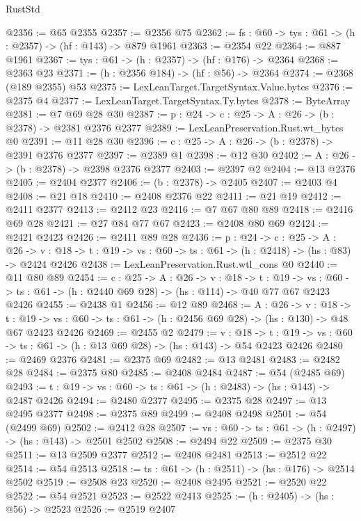 \begin{lexlean}{RustStd}
\begin{coremodule}
@2356 := @65 @2355
@2357 := @2356 @75
@2362 := {fs : @60} -> {tys : @61} -> (h : @2357) -> (hf : @143) -> @879 @1961
@2363 := @2354 @22
@2364 := @887 @1961
@2367 := {tys : @61} -> (h : @2357) -> (hf : @176) -> @2364
@2368 := @2363 @23
@2371 := (h : @2356 @184) -> (hf : @56) -> @2364
@2374 := @2368 (@189 @2355) @53
@2375 := LexLeanTarget.TargetSyntax.Value.bytes
@2376 := @2375 @4
@2377 := LexLeanTarget.TargetSyntax.Ty.bytes
@2378 := ByteArray
@2381 := @7 @69 @28 @30
@2387 := {p : @24} -> {c : @25} -> {A : @26} -> (b : @2378) -> @2381 @2376 @2377
@2389 := LexLeanPreservation.Rust.wt_bytes @0
@2391 := @11 @28 @30
@2396 := {c : @25} -> {A : @26} -> (b : @2378) -> @2391 @2376 @2377
@2397 := @2389 @1
@2398 := @12 @30
@2402 := {A : @26} -> (b : @2378) -> @2398 @2376 @2377
@2403 := @2397 @2
@2404 := @13 @2376
@2405 := @2404 @2377
@2406 := (b : @2378) -> @2405
@2407 := @2403 @4
@2408 := @21 @18
@2410 := @2408 @2376 @22
@2411 := @21 @19
@2412 := @2411 @2377
@2413 := @2412 @23
@2416 := @7 @67 @80 @89
@2418 := @2416 @69 @28
@2421 := @27 @84 @77 @67
@2423 := @2408 @80 @69
@2424 := @2421 @2423
@2426 := @2411 @89 @28
@2436 := {p : @24} ->
  {c : @25} ->
  {A : @26} ->
  {v : @18} -> {t : @19} -> {vs : @60} -> {ts : @61} -> (h : @2418) -> (hs : @83) -> @2424 @2426
@2438 := LexLeanPreservation.Rust.wtl_cons @0
@2440 := @11 @80 @89
@2454 := {c : @25} ->
  {A : @26} ->
  {v : @18} ->
  {t : @19} ->
  {vs : @60} -> {ts : @61} -> (h : @2440 @69 @28) -> (hs : @114) -> @40 @77 @67 @2423 @2426
@2455 := @2438 @1
@2456 := @12 @89
@2468 := {A : @26} ->
  {v : @18} ->
  {t : @19} -> {vs : @60} -> {ts : @61} -> (h : @2456 @69 @28) -> (hs : @130) -> @48 @67 @2423 @2426
@2469 := @2455 @2
@2479 := {v : @18} ->
  {t : @19} -> {vs : @60} -> {ts : @61} -> (h : @13 @69 @28) -> (hs : @143) -> @54 @2423 @2426
@2480 := @2469 @2376
@2481 := @2375 @69
@2482 := @13 @2481
@2483 := @2482 @28
@2484 := @2375 @80
@2485 := @2408 @2484
@2487 := @54 (@2485 @69)
@2493 := {t : @19} -> {vs : @60} -> {ts : @61} -> (h : @2483) -> (hs : @143) -> @2487 @2426
@2494 := @2480 @2377
@2495 := @2375 @28
@2497 := @13 @2495 @2377
@2498 := @2375 @89
@2499 := @2408 @2498
@2501 := @54 (@2499 @69)
@2502 := @2412 @28
@2507 := {vs : @60} -> {ts : @61} -> (h : @2497) -> (hs : @143) -> @2501 @2502
@2508 := @2494 @22
@2509 := @2375 @30
@2511 := @13 @2509 @2377
@2512 := @2408 @2481
@2513 := @2512 @22
@2514 := @54 @2513
@2518 := {ts : @61} -> (h : @2511) -> (hs : @176) -> @2514 @2502
@2519 := @2508 @23
@2520 := @2408 @2495
@2521 := @2520 @22
@2522 := @54 @2521
@2523 := @2522 @2413
@2525 := (h : @2405) -> (hs : @56) -> @2523
@2526 := @2519 @2407

\end{coremodule}
\end{lexlean}
